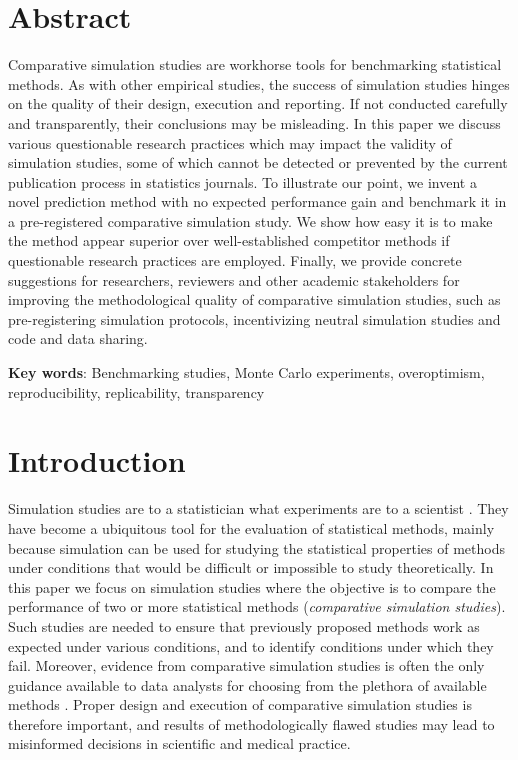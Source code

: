 \section*{Abstract}
Comparative simulation studies are workhorse tools for benchmarking statistical
methods. As with other empirical studies, the success of simulation studies
hinges on the quality of their design, execution and reporting. If not conducted
carefully and transparently, their conclusions may be misleading. In this paper
we discuss various questionable research practices which may impact the validity
of simulation studies, some of which cannot be detected or prevented by the
current publication process in statistics journals. To illustrate our point, we
invent a novel prediction method with no expected performance gain and benchmark
it in a pre-registered comparative simulation study. We show how easy it is to
make the method appear superior over well-established competitor methods if
questionable research practices are employed. Finally, we provide concrete
suggestions for researchers, reviewers and other academic stakeholders for
improving the methodological quality of comparative simulation studies, such as
pre-registering simulation protocols, incentivizing neutral simulation studies
and code and data sharing.

\textbf{Key words}: Benchmarking studies, Monte Carlo experiments, overoptimism,
reproducibility, replicability, transparency


\section{Introduction}
Simulation studies are to a statistician what experiments are to a scientist
\citep{Hoaglin1975}. They have become a ubiquitous tool for the evaluation of
statistical methods, mainly because simulation can be used for studying the
statistical properties of methods under conditions that would be difficult or
impossible to study theoretically. In this paper we focus on simulation studies
where the objective is to compare the performance of two or more statistical
methods (\emph{comparative simulation studies}). Such studies are needed to
ensure that previously proposed methods work as expected under various
conditions, and to identify conditions under which they fail. Moreover, evidence
from comparative simulation studies is often the only guidance available to data
analysts for choosing from the plethora of available methods
\citep{Boulesteix2013, Boulesteix2017b}. Proper design and execution of
comparative simulation studies is therefore important, and results of
methodologically flawed studies may lead to misinformed decisions in scientific
and medical practice.

